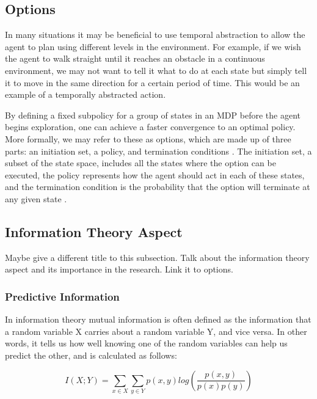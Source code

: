 \documentclass{acm_proc_article-sp}
\begin{document}
\subsection{Options}


In many situations it may be beneficial to use temporal abstraction to allow the agent to plan using different levels in the environment. For example, if we wish the agent to walk straight until it reaches an obstacle in a continuous environment, we may not want to tell it what to do at each state but simply tell it to move in the same direction for a certain period of time. This would be an example of a temporally abstracted action.

By defining a fixed subpolicy for a group of states in an MDP before the agent begins exploration, one can achieve a faster convergence to an optimal policy. More formally, we may refer to these as options, which are made up of three parts: an initiation set, a policy, and termination conditions \cite{sutton1999between}. The initiation set, a subset of the state space, includes all the states where the option can be executed, the policy represents how the agent should act in each of these states, and the termination condition is the probability that the option will terminate at any given state \cite{sutton1999between}.

\subsection{Information Theory Aspect}

Maybe give a different title to this subsection. Talk about the information theory aspect and its importance in the research. Link it to options.

\subsubsection{Predictive Information}


In information theory mutual information is often defined as the information that a random variable X carries about a random variable Y, and vice versa. In other words, it tells us how well knowing one of the random variables can help us predict the other, and is calculated as follows:

\[I(X; Y) = \sum_{x \in X}\sum_{y \in Y}p(x,y)log(\frac{p(x,y)}{p(x)p(y)})\]
\end{document}
